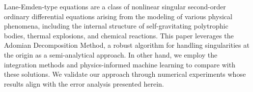 Lane-Emden-type equations are a class of nonlinear singular
second-order ordinary differential equations arising from the
modeling of various physical phenomena, including the internal
structure of self-gravitating polytrophic bodies, thermal explosions,
and chemical reactions.
This paper leverages the Adomian Decomposition Method, a robust
algorithm for handling singularities at the origin as a
semi-analytical approach.
In other hand, we employ the integration methods and physics-informed
machine learning to compare with these solutions.
We validate our approach through numerical experiments whose results
align with the error analysis presented herein.
